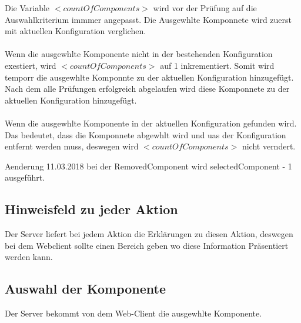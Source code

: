 \documentclass{article}
\begin{document}
\noindent Die Variable $<countOfComponents>$ wird vor der Prüfung auf die
Auswahlkriterium immmer angepasst. Die Ausgewhlte Komponnete wird zuerst mit aktuellen
Konfiguration verglichen. \\\\
Wenn die ausgewhlte Komponente nicht in der
bestehenden Konfiguration exestiert, wird $<countOfComponents>$ auf 1
inkrementiert. Somit wird temporr die ausgewhlte Komponnte zu der
aktuellen Konfiguration hinzugefügt. Nach dem alle Pr\"ufungen erfolgreich abgelaufen wird
diese Komponnete zu der aktuellen Konfiguration hinzugefügt.\\\\
Wenn die ausgewhlte Komponente in der aktuellen Konfiguration gefunden wird.
Das bedeutet, dass die Komponnete abgewhlt wird und uas der Konfiguration
entfernt werden muss, deswegen wird $<countOfComponents>$ nicht verndert.

Aenderung 11.03.2018 bei der RemovedComponent wird selectedComponent - 1
ausgeführt.

\subsection{Hinweisfeld zu jeder Aktion}
Der Server liefert bei jedem Aktion die Erklärungen zu diesen Aktion, deswegen
bei dem Webclient sollte einen Bereich geben wo diese Information Präsentiert
werden kann.

\subsection{Auswahl der Komponente}

Der Server bekommt von dem Web-Client die ausgewhlte Komponente.
\end{document}
